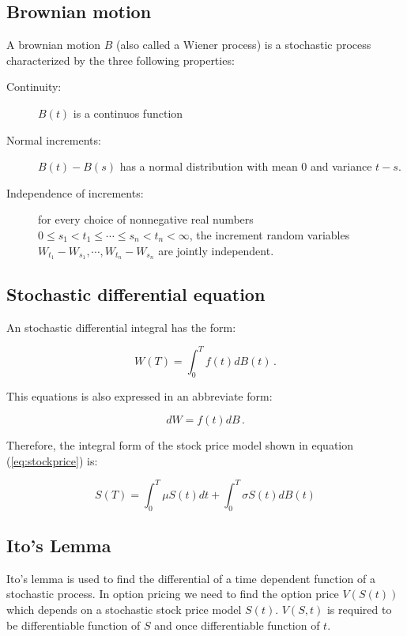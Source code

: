\subsection{Brownian motion}

A brownian motion $B$ (also called a Wiener process) is a stochastic process characterized by the three following properties:

\begin{description}
\item[Continuity:] $B(t)$ is a continuos function
\item[Normal increments:]  $B(t)-B(s)$ has a normal distribution with mean $0$ and variance $t-s$.
\item[Independence of increments:] for every choice of nonnegative real numbers $0 \leq s_1 <  t_1 \leq \cdots \leq s_n < t_n < \infty$, the increment random variables $W_{t_1} - W_{s_1}, \cdots, W_{t_n} - W_{s_n}$ are jointly independent.
\end{description}

\subsection{Stochastic differential equation}

An stochastic differential integral has the form:


\begin{equation}
W(T)=\int_0^T f(t)dB(t) \, .
\end{equation}

\noindent This equations is also expressed in an abbreviate form:

\begin{equation}
dW = f(t) dB \, .
\end{equation}

\noindent Therefore, the integral form of the stock price model shown in equation (\ref{eq:stockprice}) is:

\begin{equation}
S(T)=\int_0^T \mu S(t) dt + \int_0^T \sigma S(t) dB(t)
\end{equation}

\subsection{Ito's Lemma}

Ito's lemma is used to find the differential of a time dependent function of a stochastic process. In option pricing we need to find the option price $V(S(t))$ which depends on a stochastic stock price model $S(t)$. 
$V(S,t)$ is required to be  differentiable function of $S$ and once differentiable function of $t$.





